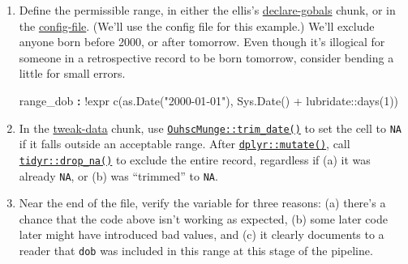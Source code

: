 \documentclass[
]{book}
\newenvironment{Shaded}{\begin{snugshade}}{\end{snugshade}}
\newcommand{\AttributeTok}[1]{\textcolor[rgb]{0.77,0.63,0.00}{#1}}
\newcommand{\DataTypeTok}[1]{\textcolor[rgb]{0.13,0.29,0.53}{#1}}
\newcommand{\DecValTok}[1]{\textcolor[rgb]{0.00,0.00,0.81}{#1}}
\newcommand{\FunctionTok}[1]{\textcolor[rgb]{0.00,0.00,0.00}{#1}}
\newcommand{\KeywordTok}[1]{\textcolor[rgb]{0.13,0.29,0.53}{\textbf{#1}}}
\newcommand{\NormalTok}[1]{#1}
\newcommand{\OperatorTok}[1]{\textcolor[rgb]{0.81,0.36,0.00}{\textbf{#1}}}
\newcommand{\StringTok}[1]{\textcolor[rgb]{0.31,0.60,0.02}{#1}}
\begin{document}
\begin{enumerate}
\def\labelenumi{\arabic{enumi}.}
\item
  Define the permissible range, in either the ellis's \protect\hyperlink{chunk-declare}{declare-gobals} chunk, or in the \protect\hyperlink{repo-config}{config-file}. (We'll use the config file for this example.) We'll exclude anyone born before 2000, or after tomorrow. Even though it's illogical for someone in a retrospective record to be born tomorrow, consider bending a little for small errors.

\begin{Shaded}
\begin{Highlighting}[]
\FunctionTok{range\_dob   }\KeywordTok{:}\AttributeTok{ !expr c(as.Date("2000{-}01{-}01"), Sys.Date() + lubridate::days(1))}
\end{Highlighting}
\end{Shaded}
\item
  In the \protect\hyperlink{chunk-tweak-data}{tweak-data} chunk, use \href{https://ouhscbbmc.github.io/OuhscMunge/reference/trim.html}{\texttt{OuhscMunge::trim\_date()}} to set the cell to \texttt{NA} if it falls outside an acceptable range. After \href{https://dplyr.tidyverse.org/reference/mutate.html}{\texttt{dplyr::mutate()}}, call \href{https://tidyr.tidyverse.org/reference/drop_na.html}{\texttt{tidyr::drop\_na()}} to exclude the entire record, regardless if (a) it was already \texttt{NA}, or (b) was ``trimmed'' to \texttt{NA}.

\begin{Shaded}
\end{Shaded}
\item
  Near the end of the file, verify the variable for three reasons: (a) there's a chance that the code above isn't working as expected, (b) some later code later might have introduced bad values, and (c) it clearly documents to a reader that \texttt{dob} was included in this range at this stage of the pipeline.

\begin{Shaded}
\end{Shaded}
\end{enumerate}
\end{document}
